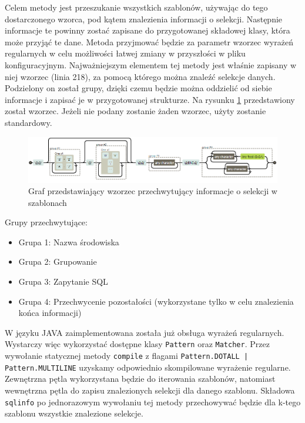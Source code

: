 Celem metody jest przeszukanie wszystkich szablonów, używając do tego dostarczonego wzorca, pod kątem znalezienia informacji o selekcji. Następnie informacje te powinny zostać zapisane do przygotowanej składowej klasy, która może przyjąć te dane. 
Metoda przyjmować będzie za parametr wzorzec wyrażeń regularnych w celu możliwości łatwej zmiany w przyszłości w pliku konfiguracyjnym. 
Najważniejszym elementem tej metody jest właśnie zapisany w niej wzorzec (linia 218), za pomocą którego można znaleźć selekcje danych. Podzielony on został grupy, dzięki czemu będzie można oddzielić od siebie informacje i zapisać je w przygotowanej strukturze. Na rysunku \ref{fig:Wzorzec} przedstawiony został wzorzec. Jeżeli nie podany zostanie żaden wzorzec, użyty zostanie standardowy. 
\begin{figure}[h]
    \centering
    
    \includegraphics[width=1\textwidth]{rys/implementacja/regex.png}
    \caption{Graf przedstawiający wzorzec przechwytujący informacje o selekcji w szablonach}
    \label{fig:Wzorzec}
\end{figure}
\par
Grupy przechwytujące:
\begin{itemize}
\item Grupa 1: Nazwa środowiska
\item Grupa 2: Grupowanie
\item Grupa 3: Zapytanie SQL
\item Grupa 4: Przechwycenie pozostałości (wykorzystane tylko w celu znalezienia końca informacji)
\end{itemize}
\vspace{5mm}
 \par
W języku JAVA zaimplementowana została już obsługa wyrażeń regularnych. Wystarczy więc wykorzystać dostępne klasy \texttt{Pattern} oraz \texttt{Matcher}. Przez wywołanie statycznej metody \texttt{compile} z flagami \texttt{Pattern.DOTALL | Pattern.MULTILINE} uzyskamy odpowiednio skompilowane wyrażenie regularne. Zewnętrzna pętla wykorzystana będzie do iterowania szablonów, natomiast wewnętrzna pętla do zapisu znalezionych selekcji dla danego szablonu. Składowa \texttt{sqlinfo} po jednorazowym wywołaniu tej metody przechowywać będzie dla k-tego szablonu wszystkie znalezione selekcje.


